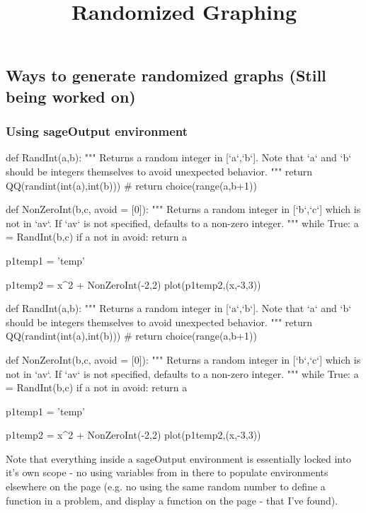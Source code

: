 \documentclass{ximera}
\title{Randomized Graphing}
\begin{document}
%

\maketitle




\subsection*{Ways to generate randomized graphs (Still being worked on)}

\subsubsection*{Using sageOutput environment}

\begin{sageOutput}
def RandInt(a,b):
    """ Returns a random integer in [`a`,`b`]. Note that `a` and `b` should be integers themselves to avoid unexpected behavior.
    """
    return QQ(randint(int(a),int(b)))
    # return choice(range(a,b+1))

def NonZeroInt(b,c, avoid = [0]):
    """ Returns a random integer in [`b`,`c`] which is not in `av`. 
        If `av` is not specified, defaults to a non-zero integer.
    """
    while True:
        a = RandInt(b,c)
        if a not in avoid:
            return a

p1temp1 = 'temp'

p1temp2 = x^2 + NonZeroInt(-2,2)
plot(p1temp2,(x,-3,3))
\end{sageOutput}

\begin{sagesilent}
def RandInt(a,b):
    """ Returns a random integer in [`a`,`b`]. Note that `a` and `b` should be integers themselves to avoid unexpected behavior.
    """
    return QQ(randint(int(a),int(b)))
    # return choice(range(a,b+1))

def NonZeroInt(b,c, avoid = [0]):
    """ Returns a random integer in [`b`,`c`] which is not in `av`. 
        If `av` is not specified, defaults to a non-zero integer.
    """
    while True:
        a = RandInt(b,c)
        if a not in avoid:
            return a

p1temp1 = 'temp'

p1temp2 = x^2 + NonZeroInt(-2,2)
plot(p1temp2,(x,-3,3))
\end{sagesilent}


Note that everything inside a sageOutput environment is essentially locked into it's own scope - no using variables from in there to populate environments elsewhere on the page (e.g. no using the same random number to define a function in a problem, and display a function on the page - that I've found).
\end{document}
